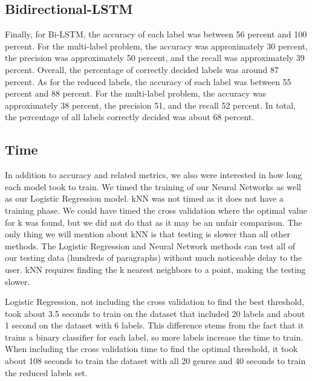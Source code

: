 \documentclass[sigconf]{acmart}
\begin{document}
\subsection{Bidirectional-LSTM}
Finally, for Bi-LSTM, the accuracy of each label was between 56 percent and 100 percent. For the multi-label problem, the accuracy was approximately 30 percent, the precision was approximately 50 percent, and the recall was approximately 39 percent. Overall, the percentage of correctly decided labels was around 87 percent. As for the reduced labels, the accuracy of each label was between 55 percent and 88 percent. For the multi-label problem, the accuracy was approximately 38 percent, the precision 51, and the recall 52 percent. In total, the percentage of all labels correctly decided was about 68 percent.

\subsection{Time}
In addition to accuracy and related metrics, we also were interested in how long each model took to train.  We timed the training of our Neural Networks as well as our Logistic Regression model. kNN was not timed as it does not have a training phase.  We could have timed the cross validation where the optimal value for k was found, but we did not do that as it may be an unfair comparison.  The only thing we will mention about kNN is that testing is slower than all other methods.  The Logistic Regression and Neural Network methods can test all of our testing data (hundreds of paragraphs) without much noticeable delay to the user.  kNN requires finding the k nearest neighbors to a point, making the testing slower.

Logistic Regression, not including the cross validation to find the best threshold, took about 3.5 seconds to train on the dataset that included 20 labels and about 1 second on the dataset with 6 labels. This difference stems from the fact that it trains a binary classifier for each label, so more labels increase the time to train. When including the cross validation time to find the optimal threshold, it took about 108 seconds to train the dataset with all 20 genres and 40 seconds to train the reduced labels set. 
\end{document}
